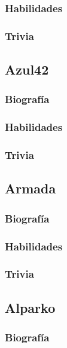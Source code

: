 \documentclass[letterpaper]{article}
\begin{document}
\subsubsection{Habilidades}

\subsubsection{Trivia}
\subsection{Azul42}

\subsubsection{Biografía}

\subsubsection{Habilidades}

\subsubsection{Trivia}

\subsection{Armada}

\subsubsection{Biografía}

\subsubsection{Habilidades}

\subsubsection{Trivia}

\subsection{Alparko}

\subsubsection{Biografía}
\end{document}
